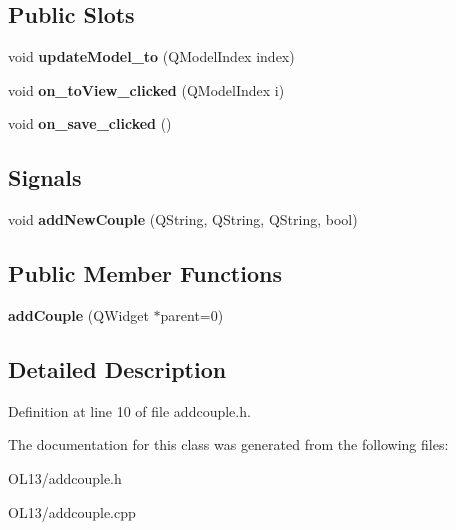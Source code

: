 \subsection*{Public Slots}
\begin{DoxyCompactItemize}
\item 
\mbox{\label{classadd_couple_aa0334cda3e89d32093da234cbd1e8c07}} 
void {\bfseries update\+Model\+\_\+to} (Q\+Model\+Index index)
\item 
\mbox{\label{classadd_couple_af8d724cab931e45a5e68a341fd831aca}} 
void {\bfseries on\+\_\+to\+View\+\_\+clicked} (Q\+Model\+Index i)
\item 
\mbox{\label{classadd_couple_ad3a6409a37b17097325d0b65ee1ab15b}} 
void {\bfseries on\+\_\+save\+\_\+clicked} ()
\end{DoxyCompactItemize}
\subsection*{Signals}
\begin{DoxyCompactItemize}
\item 
\mbox{\label{classadd_couple_a2c807c5516dfa2ff6ecd00622914eb4c}} 
void {\bfseries add\+New\+Couple} (Q\+String, Q\+String, Q\+String, bool)
\end{DoxyCompactItemize}
\subsection*{Public Member Functions}
\begin{DoxyCompactItemize}
\item 
\mbox{\label{classadd_couple_a5c478c6e07cd0b9639c4c84687c89764}} 
{\bfseries add\+Couple} (Q\+Widget $\ast$parent=0)
\end{DoxyCompactItemize}


\subsection{Detailed Description}


Definition at line 10 of file addcouple.\+h.



The documentation for this class was generated from the following files\+:\begin{DoxyCompactItemize}
\item 
O\+L13/addcouple.\+h\item 
O\+L13/addcouple.\+cpp\end{DoxyCompactItemize}
